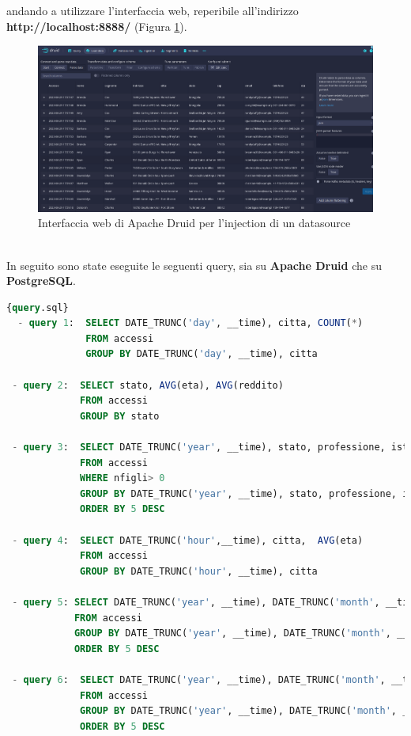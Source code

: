 andando a utilizzare l'interfaccia web, reperibile all'indirizzo
\textbf{http://localhost:8888/} (Figura \ref{fig:injection}).
\begin{figure}[h]
  \centering
  \includegraphics[width=1\textwidth]{images/percorso/load_data.png}
  \caption{Interfaccia web di Apache Druid per l'injection di un datasource}
  \label{fig:injection}
\end{figure}
\pagebreak
\\
In seguito sono state eseguite le seguenti query, sia su \textbf{Apache Druid} che su \textbf{PostgreSQL}.
\begin{lstlisting}[language=SQL, caption=\texttt{query.sql}, label=lst:file]{query.sql}
  - query 1:  SELECT DATE_TRUNC('day', __time), citta, COUNT(*)
              FROM accessi
              GROUP BY DATE_TRUNC('day', __time), citta
       
 - query 2:  SELECT stato, AVG(eta), AVG(reddito)
             FROM accessi
             GROUP BY stato
       
 - query 3:  SELECT DATE_TRUNC('year', __time), stato, professione, istruzione, nfigli, COUNT(*)
             FROM accessi
             WHERE nfigli> 0
             GROUP BY DATE_TRUNC('year', __time), stato, professione, istruzione, nfigli
             ORDER BY 5 DESC
       
 - query 4:  SELECT DATE_TRUNC('hour',__time), citta,  AVG(eta)
             FROM accessi
             GROUP BY DATE_TRUNC('hour', __time), citta  
 
 - query 5: SELECT DATE_TRUNC('year', __time), DATE_TRUNC('month', __time), DATE_TRUNC('day', __time),    stato, professione, istruzione, nfigli, COUNT(*) 
            FROM accessi
            GROUP BY DATE_TRUNC('year', __time), DATE_TRUNC('month', __time), DATE_TRUNC('day', __time), stato, professione, istruzione, nfigli
            ORDER BY 5 DESC

 - query 6:  SELECT DATE_TRUNC('year', __time), DATE_TRUNC('month', __time), DATE_TRUNC('day', __time), DATE_TRUNC('hour', __time), stato, professione, istruzione, nfigli, COUNT(*) 
             FROM accessi
             GROUP BY DATE_TRUNC('year', __time), DATE_TRUNC('month', __time), DATE_TRUNC('day', __time), DATE_TRUNC('hour', __time), stato, professione, istruzione, nfigli
             ORDER BY 5 DESC           
 \end{lstlisting}

